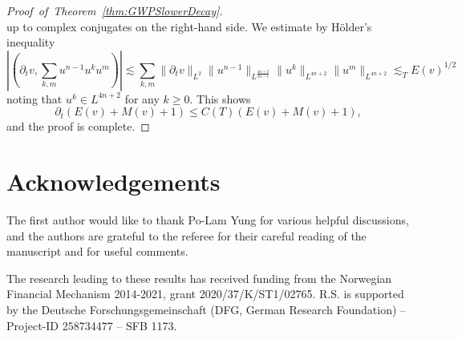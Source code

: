 \documentclass{amsart}
\theoremstyle{definition}
\numberwithin{equation}{section}
\begin{document}
\begin{proof}[Proof~of~Theorem~\ref{thm:GWPSlowerDecay}]
\begin{equation*}
\end{equation*}
up to complex conjugates on the right-hand side. We estimate by H\"older's inequality
\begin{equation*}
|(\partial_t v, \sum_{k,m} u^{n-1} u^k u^m)| \lesssim \sum_{k,m} \| \partial_t v \|_{L^2} \| u^{n-1} \|_{L^{\frac{4n+2}{2n-1}}} \| u^k \|_{L^{4n+2}} \| u^m \|_{L^{4n+2}} \lesssim_T E(v)^{1/2}
\end{equation*}
noting that $u^k \in L^{4n+2}$ for any $k \geq 0$. This shows
\begin{equation*}
\partial_t (E(v) + M(v) + 1) \leq C(T) (E(v) + M(v) + 1),
\end{equation*}
and the proof is complete.
\end{proof}

\section*{Acknowledgements}

The first author would like to thank Po-Lam Yung for various helpful discussions, and the authors are grateful to the referee for their careful reading of the manuscript and for useful comments.

The research leading to these results has received funding from the Norwegian Financial Mechanism 2014-2021, grant 2020/37/K/ST1/02765. R.S. is supported by the Deutsche Forschungsgemeinschaft (DFG, German Research Foundation) -- Project-ID 258734477 -- SFB 1173. 
\end{document}
